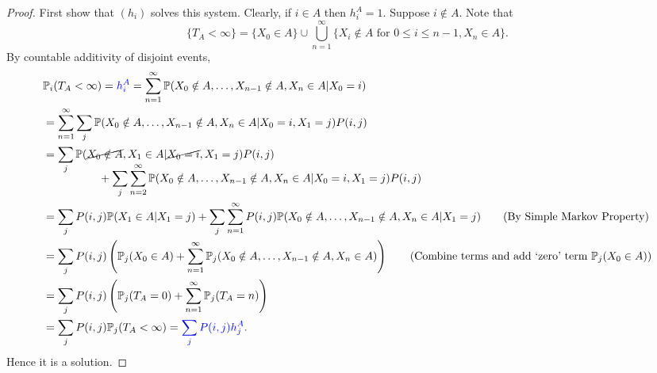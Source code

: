 \documentclass[a4paper]{article}
\begin{document}
\begin{proof}
	First show that $(h_i)$ solves this system. Clearly, if $i\in A$ then $ h_i^A=1 $. Suppose $i\notin A$. Note that 
    \[
        \{T_A<\infty\} = \{X_0\in A\} \cup \bigcup_{n=1}^{\infty}\{X_i\notin A \text{ for }0\le i\le n-1, X_n\in A\}.
    \]
    By countable additivity of disjoint events,
    \begin{align*}
        &\mathbb{P}_i(T_A< \infty)={\color{blue}h_i^A} =\sum_{n=1}^{\infty}\mathbb{P}(X_0\notin A,\dots,X_{n-1}\notin A, X_n\in A|X_0=i)\\ 
            &= \sum_{n=1}^{\infty} \sum_{j} \mathbb{P}(X_0\notin A,\dots,X_{n-1}\notin A, X_n\in A|X_0=i,X_1=j)P(i,j)\\ 
            &=\sum_j \mathbb{P}(\cancel{X_0\notin A}, X_1\in A|\cancel{X_0=i},X_1=j)P(i,j)\\[-13pt]
            &\hspace{5em}+\sum_j \sum_{n=2}^{\infty}\mathbb{P}(X_0\notin A,\dots,X_{n-1}\notin A, X_n\in A|X_0=i,X_1=j)P(i,j)\\ 
            &=\sum_j P(i,j)\mathbb{P}(X_1\in A|X_1=j)+\sum_j \sum_{n=1}^{\infty}P(i,j)\mathbb{P}(X_0\notin A,\dots,X_{n-1}\notin A, X_n\in A|X_1=j)\tag{By Simple Markov Property}\\ 
            &= \sum_j P(i,j) \left( \mathbb{P}_j(X_0\in A)+\sum_{n=1}^{\infty} \mathbb{P}_j(X_0\notin A,\dots,X_{n-1}\notin A, X_n\in A)\right)\tag{Combine terms and add `zero' term $\mathbb{P}_j(X_0\in A)$}\\ 
            &= \sum_j P(i,j) \left( \mathbb{P}_j(T_A=0)+ \sum_{n=1}^{\infty}\mathbb{P}_j(T_A=n) \right)\\ 
            &= \sum_j P(i,j) \bbP_j(T_A< \infty ) = {\color{blue}\sum_j P(i,j)h_j^A}.
    \end{align*}
    Hence it is a solution.


\end{proof}
\end{document}
